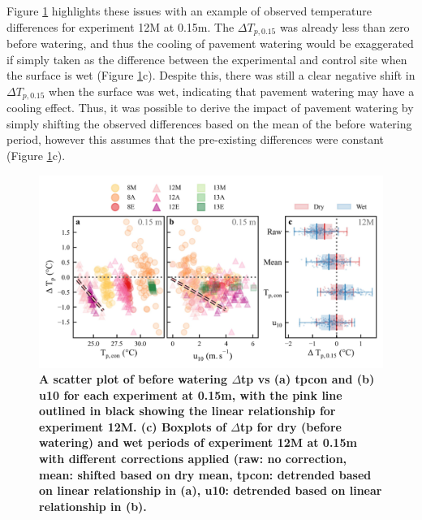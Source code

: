 \documentclass[final,3p,times,authoryear]{elsarticle}
\begin{document}
Figure \ref{fig:3.1} highlights these issues with an example of observed temperature differences for experiment 12M at 0.15m. The $\Delta$$T_{p,0.15}$ was already less than zero before watering, and thus the cooling of pavement watering would be exaggerated if simply taken as the difference between the experimental and control site when the surface is wet (Figure \ref{fig:3.1}c). Despite this, there was still a clear negative shift in $\Delta$$T_{p,0.15}$ when the surface was wet, indicating that pavement watering may have a cooling effect. Thus, it was possible to derive the impact of pavement watering by simply shifting the observed differences based on the mean of the before watering period, however this assumes that the pre-existing differences were constant (Figure \ref{fig:3.1}c).

\begin{figure}
\centering
\includegraphics[trim={0 0 0 0},clip,scale=1.2]{control_t_wind_correction_compare_one.jpg}
\caption{\bf A scatter plot of before watering $\Delta$\gls{tp} vs (a) \gls{tpcon} and (b) \gls{u10} for each experiment at 0.15m, with the pink line outlined in black showing the linear relationship for experiment 12M. (c) Boxplots of $\Delta$\gls{tp} for dry (before watering) and wet periods of experiment 12M at 0.15m with different corrections applied (raw: no correction, mean: shifted based on dry mean, \gls{tpcon}: detrended based on linear relationship in (a), \gls{u10}: detrended based on linear relationship in (b).}
 \label{fig:3.1}
\end{figure}
\end{document}
